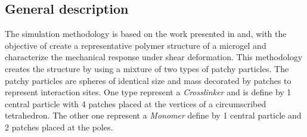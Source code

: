 \documentclass[../main.tex]{subfiles}
\begin{document}
\subsection{General description}

The simulation methodology is based on the work presented in\citep{gnanSilicoSynthesisMicrogel2017} and\citep{sorichettiStructureElasticityModel2023}, with the objective of create a representative polymer structure of a microgel and characterize the mechanical response under shear deformation.
This methodology creates the structure by using a mixture of two types of patchy particles.
The patchy particles are spheres of identical size and mass decorated by patches to represent interaction sites.
One type represent a \textit{Crosslinker} and is define by 1 central particle with 4 patches placed at the vertices of a circumscribed tetrahedron. %
The other one represent a \textit{Monomer} define by 1 central particle and 2 patches placed at the poles.
\end{document}
